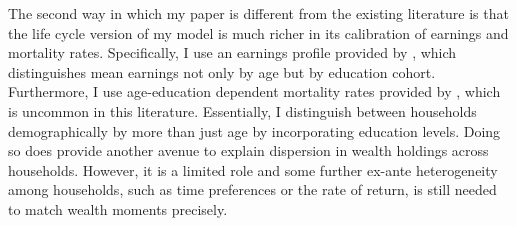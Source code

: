 \par The second way in which my paper is different from the existing literature is that the life cycle version of my model is much richer in its calibration of earnings and mortality rates. Specifically, I use an earnings profile provided by \cite{Cagetti2003}, which distinguishes mean earnings not only by age but by education cohort. Furthermore, I use age-education dependent mortality rates provided by \cite{Brown2007}, which is uncommon in this literature. Essentially, I distinguish between households demographically by more than just age by incorporating education levels. Doing so does provide another avenue to explain dispersion in wealth holdings across households. However, it is a limited role and some further ex-ante heterogeneity among households, such as time preferences or the rate of return, is still needed to match wealth moments precisely. 